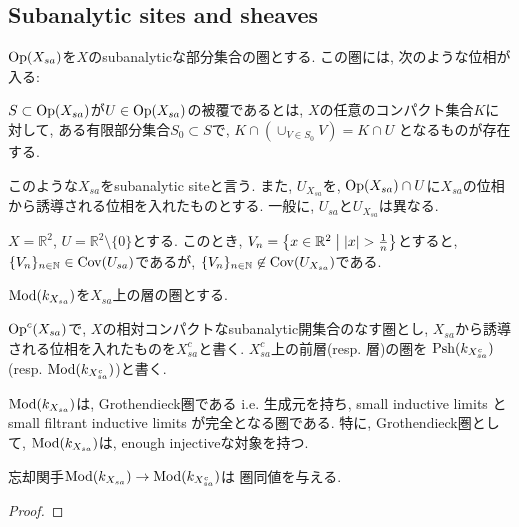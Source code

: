 \documentclass[../main]{subfiles}
\begin{document}
\setcounter{section}{1}
\setcounter{subsection}{2} \addtocounter{subsection}{-1}
\subsection{Subanalytic sites and sheaves}
\begin{dfn}
  $\mathrm{Op}(X_{sa})$を$X$のsubanalyticな部分集合の圏とする.
  この圏には, 次のような位相が入る:

  $S\subset\mathrm{Op}(X_{sa})$が$U\in\mathrm{Op}(X_{sa})$の被覆であるとは,
  $X$の任意のコンパクト集合$K$に対して,
  ある有限部分集合$S_0\subset S$で,
  $K\cap (\cup_{V\in S_0} V) = K\cap U$
  となるものが存在する.

  このような$X_{sa}$をsubanalytic siteと言う.
  また, $U_{X_{sa}}$を,
  $\mathrm{Op}(X_{sa})\cap U$に$X_{sa}$の位相から誘導される位相を入れたものとする.
  一般に, $U_{sa}$と$U_{X_{sa}}$は異なる.
\end{dfn}

\begin{eg}
  $X = \mathbb{R}^2$, $U = \mathbb{R}^2\setminus\{0\}$とする.
  このとき, $V_n = \left\{ x\in\mathbb{R}^2 \relmiddle{|} |x|>\frac{1}{n} \right\}$とすると,
  $\{V_n\}_{n\in\mathbb{N}}\in\mathrm{Cov}(U_{sa})$であるが,
  $\{V_n\}_{n\in\mathbb{N}}\not\in\mathrm{Cov}(U_{X_{sa}})$である.
\end{eg}

\begin{dfn}
  $\mathrm{Mod}(k_{X_{sa}})$を$X_{sa}$上の層の圏とする.
\end{dfn}

\begin{dfn}
  $\mathrm{Op}^c(X_{sa})$で,
  $X$の相対コンパクトなsubanalytic開集合のなす圏とし,
  $X_{sa}$から誘導される位相を入れたものを$X_{sa}^c$と書く.
  $X_{sa}^c$上の前層(resp. 層)の圏を
  $\mathrm{Psh}(k_{X_{sa}^c})$(resp. $\mathrm{Mod}(k_{X_{sa}^c})$)と書く.
\end{dfn}

\begin{prop}
  $\mathrm{Mod}(k_{X_{sa}})$は, Grothendieck圏である
  i.e.
  生成元を持ち,
  small inductive limits と
  small filtrant inductive limits が完全となる圏である.
  特に, Grothendieck圏として,
  $\mathrm{Mod}(k_{X_{sa}})$は, enough injectiveな対象を持つ.
\end{prop}

\begin{prop}
  忘却関手$\mathrm{Mod}(k_{X_{sa}})\to\mathrm{Mod}(k_{X_{sa}^c})$は
  圏同値を与える.
\end{prop}
\begin{proof}
\end{proof}
\end{document}
